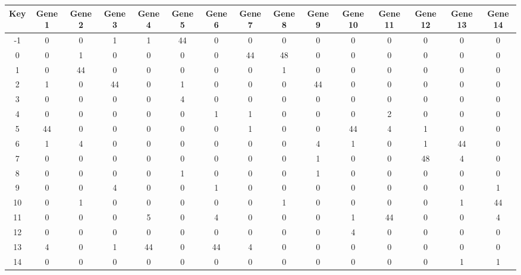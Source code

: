 \begin{tabular}{|c|c|c|c|c|c|c|c|c|c|c|c|c|c|c|}
\hline
Key & Gene 1 & Gene 2 & Gene 3 & Gene 4 & Gene 5 & Gene 6 & Gene 7 & Gene 8 & Gene 9 & Gene 10 & Gene 11 & Gene 12 & Gene 13 & Gene 14 \\
\hline
-1 & 0 & 0 & 1 & 1 & 44 & 0 & 0 & 0 & 0 & 0 & 0 & 0 & 0 & 0 \\
0 & 0 & 1 & 0 & 0 & 0 & 0 & 44 & 48 & 0 & 0 & 0 & 0 & 0 & 0 \\
1 & 0 & 44 & 0 & 0 & 0 & 0 & 0 & 1 & 0 & 0 & 0 & 0 & 0 & 0 \\
2 & 1 & 0 & 44 & 0 & 1 & 0 & 0 & 0 & 44 & 0 & 0 & 0 & 0 & 0 \\
3 & 0 & 0 & 0 & 0 & 4 & 0 & 0 & 0 & 0 & 0 & 0 & 0 & 0 & 0 \\
4 & 0 & 0 & 0 & 0 & 0 & 1 & 1 & 0 & 0 & 0 & 2 & 0 & 0 & 0 \\
5 & 44 & 0 & 0 & 0 & 0 & 0 & 1 & 0 & 0 & 44 & 4 & 1 & 0 & 0 \\
6 & 1 & 4 & 0 & 0 & 0 & 0 & 0 & 0 & 4 & 1 & 0 & 1 & 44 & 0 \\
7 & 0 & 0 & 0 & 0 & 0 & 0 & 0 & 0 & 1 & 0 & 0 & 48 & 4 & 0 \\
8 & 0 & 0 & 0 & 0 & 1 & 0 & 0 & 0 & 1 & 0 & 0 & 0 & 0 & 0 \\
9 & 0 & 0 & 4 & 0 & 0 & 1 & 0 & 0 & 0 & 0 & 0 & 0 & 0 & 1 \\
10 & 0 & 1 & 0 & 0 & 0 & 0 & 0 & 1 & 0 & 0 & 0 & 0 & 1 & 44 \\
11 & 0 & 0 & 0 & 5 & 0 & 4 & 0 & 0 & 0 & 1 & 44 & 0 & 0 & 4 \\
12 & 0 & 0 & 0 & 0 & 0 & 0 & 0 & 0 & 0 & 4 & 0 & 0 & 0 & 0 \\
13 & 4 & 0 & 1 & 44 & 0 & 44 & 4 & 0 & 0 & 0 & 0 & 0 & 0 & 0 \\
14 & 0 & 0 & 0 & 0 & 0 & 0 & 0 & 0 & 0 & 0 & 0 & 0 & 1 & 1 \\
\hline
\end{tabular}